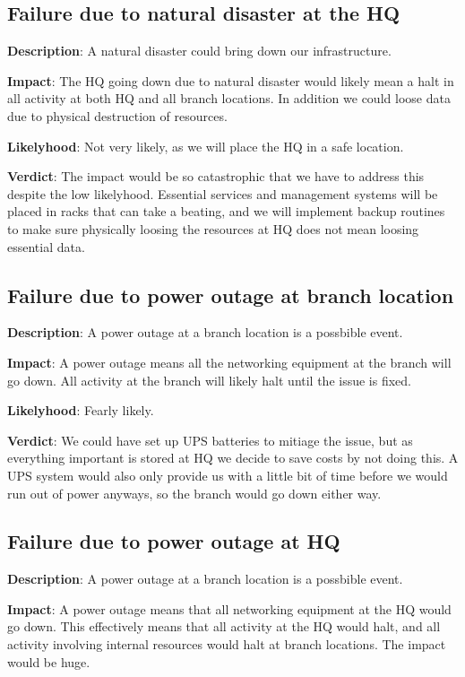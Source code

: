 \subsection{Failure due to natural disaster at the HQ}

\textbf{Description}: A natural disaster could bring down our infrastructure.

\textbf{Impact}: The HQ going down due to natural disaster would likely mean a halt in all activity at both HQ and all branch locations. In addition we could loose data due to physical destruction of resources.

\textbf{Likelyhood}: Not very likely, as we will place the HQ in a safe location.

\textbf{Verdict}: The impact would be so catastrophic that we have to address this despite the low likelyhood. Essential services and management systems will be placed in racks that can take a beating\cite{todo}, and we will implement backup routines to make sure physically loosing the resources at HQ does not mean loosing essential data.

\subsection{Failure due to power outage at branch location}

\textbf{Description}: A power outage at a branch location is a possbible event.

\textbf{Impact}: A power outage means all the networking equipment at the branch will go down. All activity at the branch will likely halt until the issue is fixed.

\textbf{Likelyhood}: Fearly likely.

\textbf{Verdict}: We could have set up UPS batteries to mitiage the issue, but as everything important is stored at HQ we decide to save costs by not doing this. A UPS system would also only provide us with a little bit of time before we would run out of power anyways, so the branch would go down either way.

\subsection{Failure due to power outage at HQ}

\textbf{Description}: A power outage at a branch location is a possbible event.

\textbf{Impact}: A power outage means that all networking equipment at the HQ would go down. This effectively means that all activity at the HQ would halt, and all activity involving internal resources would halt at branch locations. The impact would be huge.

